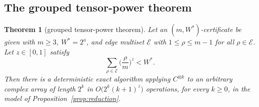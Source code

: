 \documentclass[11pt]{article}
\newtheorem{theorem}{Theorem}[section]
\theoremstyle{definition}
\theoremstyle{remark}
\newcommand{\E}{\mathcal{E}}
\begin{document}
\subsection{The grouped tensor-power theorem}
\begin{theorem}[grouped tensor-power theorem]\label{thm:grouped}
Let an $(m,W^*)$-certificate be given with $m\ge3$, $W^*=2^a$, and edge multiset $\E$ with
$1\le\rho\le m-1$ for all $\rho\in\E$. Let $z\in[0,1]$ satisfy
\begin{equation}\label{eq:rate}
  \sum_{\rho\in\E}\Big(\frac\rho m\Big)^z<W^* .
\end{equation}
Then there is a deterministic exact algorithm applying $C^{\otimes k}$ to an arbitrary complex array of
length $2^k$ in $O\big(2^k(k+1)^z\big)$ operations, for every $k\ge0$, in the model of
Proposition~\ref{prop:reduction}.
\end{theorem}
\end{document}
